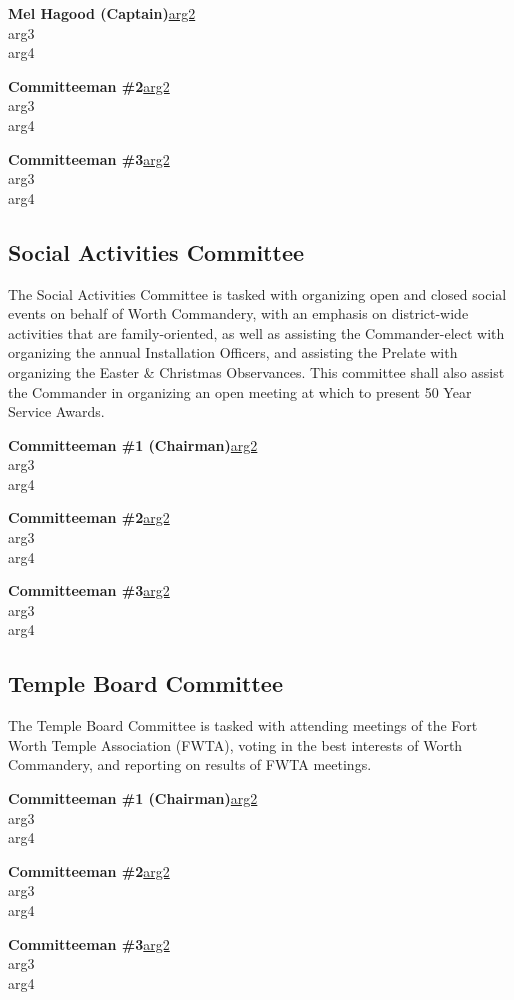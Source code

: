 \documentclass[letterpaper]{article}
\newcommand{\cman}[4]{\textbf{#1}\hfill{}\url{#2}\\\hphantom{0em}\hfill{}#3\\\hphantom{0em}\hfill{}#4}
\newcommand{\comm}[3]{\subsection*{#1 Committee\textsuperscript{#2}}The #1 Committee is tasked with #3}
\begin{document}
		\cman{Mel Hagood (Captain)}{arg2}{arg3}{arg4}
		
		\cman{Committeeman \#2}{arg2}{arg3}{arg4}
		
		\cman{Committeeman \#3}{arg2}{arg3}{arg4}
	
	\comm{Social Activities}{}{organizing open and closed social events on behalf of Worth Commandery, with an emphasis on district-wide activities that are family-oriented, as well as assisting the Commander-elect with organizing the annual Installation Officers, and assisting the Prelate with organizing the Easter \& Christmas Observances. This committee shall also assist the Commander in organizing an open meeting at which to present 50 Year Service Awards.}
	
		\cman{Committeeman \#1 (Chairman)}{arg2}{arg3}{arg4}
		
		\cman{Committeeman \#2}{arg2}{arg3}{arg4}
		
		\cman{Committeeman \#3}{arg2}{arg3}{arg4}
	
	\comm{Temple Board}{}{attending meetings of the Fort Worth Temple Association (FWTA), voting in the best interests of Worth Commandery, and reporting on results of FWTA meetings.}
	
		\cman{Committeeman \#1 (Chairman)}{arg2}{arg3}{arg4}
		
		\cman{Committeeman \#2}{arg2}{arg3}{arg4}
		
		\cman{Committeeman \#3}{arg2}{arg3}{arg4}
\end{document}
